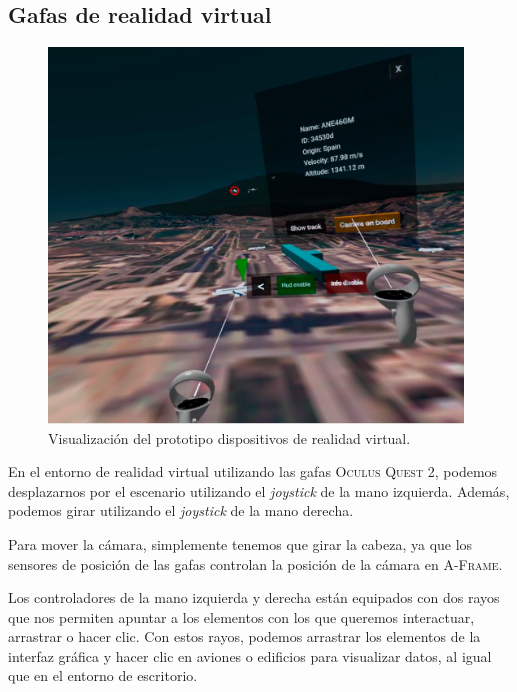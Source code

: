 \documentclass[a4paper, 11pt]{book}
\begin{document}
\subsection{Gafas de realidad virtual}
\begin{figure}[h]
	\centering
	\includegraphics[width=11cm, keepaspectratio]{img/oculusDemo.png}
	\caption{Visualización del prototipo dispositivos de realidad virtual.}
	\label{fig:scrum}
\end{figure}
En el entorno de realidad virtual utilizando las gafas \textsc{Oculus Quest 2}, podemos desplazarnos por el escenario utilizando el \emph{joystick} de la mano izquierda. Además, podemos girar utilizando el \emph{joystick} de la mano derecha.

Para mover la cámara, simplemente tenemos que girar la cabeza, ya que los sensores de posición de las gafas controlan la posición de la cámara en \textsc{A-Frame}.

Los controladores de la mano izquierda y derecha están equipados con dos rayos que nos permiten apuntar a los elementos con los que queremos interactuar, arrastrar o hacer clic. Con estos rayos, podemos arrastrar los elementos de la interfaz gráfica y hacer clic en aviones o edificios para visualizar datos, al igual que en el entorno de escritorio.
\end{document}
